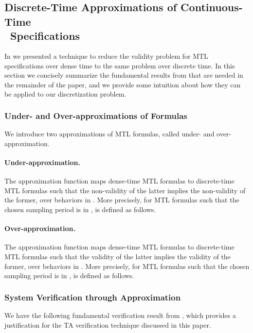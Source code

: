 \documentclass[a4paper]{article}
\newcommand{\mtlstar}{MTL}
\theoremstyle{plain}
\theoremstyle{definition}
\begin{document}
\subsection{Discrete-Time Approximations of Continuous-Time \\ \ Specifications} \label{sec:discretization}
In \cite{FPR08-FM08} we presented a technique to reduce the validity problem for MTL specifications over dense time to the same problem over discrete time.
In this section we concisely summarize the fundamental results from \cite{FPR08-FM08} that are needed in the remainder of the paper, and we provide some intuition about how they can be applied to our discretization problem.


\subsubsection{Under- and Over-ap\-prox\-i\-ma\-tions of Formulas}
We introduce two approximations of MTL formulas, called under- and over-ap\-prox\-i\-ma\-tion.


\paragraph{Under-ap\-prox\-i\-ma\-tion.}
The approximation function  maps dense-time MTL formulas to discrete-time \mtlstar{} formulas such that the non-validity of the latter implies the non-validity of the former, over behaviors in .
More precisely, for MTL formulas such that the chosen sampling period  is in ,  is defined as follows.



\paragraph{Over-ap\-prox\-i\-ma\-tion.}
The approximation function  maps dense-time MTL formulas to discrete-time MTL formulas such that the validity of the latter implies the validity of the former, over behaviors in .
More precisely, for MTL formulas such that the chosen sampling period  is in ,  is defined as follows.






\subsubsection{System Verification through Approximation}
We have the following fundamental verification result from \cite{FPR08-FM08}, which provides a justification for the TA verification technique discussed in this paper.
\end{document}
